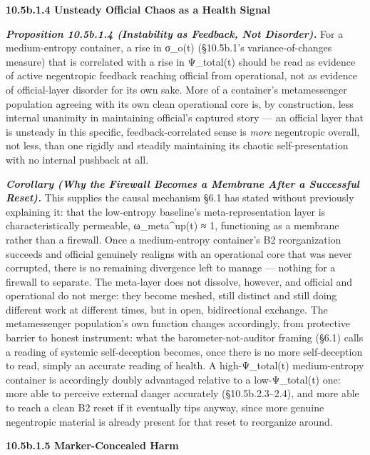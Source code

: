 \documentclass[
]{article}
\begin{document}
\textbf{10.5b.1.4 Unsteady Official Chaos as a Health Signal}

\emph{\textbf{Proposition 10.5b.1.4 (Instability as Feedback, Not
Disorder).}} For a medium-entropy container, a rise in σ\_o(t)
(§10.5b.1's variance-of-changes measure) that is correlated with a rise
in Ψ\_total(t) should be read as evidence of active negentropic feedback
reaching official from operational, not as evidence of official-layer
disorder for its own sake. More of a container's metamessenger
population agreeing with its own clean operational core is, by
construction, less internal unanimity in maintaining official's captured
story --- an official layer that is unsteady in this specific,
feedback-correlated sense is \emph{more} negentropic overall, not less,
than one rigidly and steadily maintaining its chaotic self-presentation
with no internal pushback at all.

\emph{\textbf{Corollary (Why the Firewall Becomes a Membrane After a
Successful Reset).}} This supplies the causal mechanism §6.1 has stated
without previously explaining it: that the low-entropy baseline's
meta-representation layer is characteristically permeable,
ω\_meta\^{}up(t) ≈ 1, functioning as a membrane rather than a firewall.
Once a medium-entropy container's B2 reorganization succeeds and
official genuinely realigns with an operational core that was never
corrupted, there is no remaining divergence left to manage --- nothing
for a firewall to separate. The meta-layer does not dissolve, however,
and official and operational do not merge: they become meshed, still
distinct and still doing different work at different times, but in open,
bidirectional exchange. The metamessenger population's own function
changes accordingly, from protective barrier to honest instrument: what
the barometer-not-auditor framing (§6.1) calls a reading of systemic
self-deception becomes, once there is no more self-deception to read,
simply an accurate reading of health. A high-Ψ\_total(t) medium-entropy
container is accordingly doubly advantaged relative to a low-Ψ\_total(t)
one: more able to perceive external danger accurately (§10.5b.2.3--2.4),
and more able to reach a clean B2 reset if it eventually tips anyway,
since more genuine negentropic material is already present for that
reset to reorganize around.

\textbf{10.5b.1.5 Marker-Concealed Harm}
\end{document}
